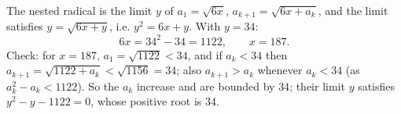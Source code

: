 The nested radical is the limit $y$ of $a_1=\sqrt{6x}$, $a_{k+1}=\sqrt{6x+a_k}$, and the limit satisfies $y=\sqrt{6x+y}$, i.e. $y^2=6x+y$. With $y=34$:
\[6x=34^2-34=1122,\qquad x=\boxed{187}.\]
Check: for $x=187$, $a_1=\sqrt{1122}<34$, and if $a_k<34$ then $a_{k+1}=\sqrt{1122+a_k}<\sqrt{1156}=34$; also $a_{k+1}>a_k$ whenever $a_k<34$ (as $a_k^2-a_k<1122$). So the $a_k$ increase and are bounded by $34$; their limit $y$ satisfies $y^2-y-1122=0$, whose positive root is $34$.
